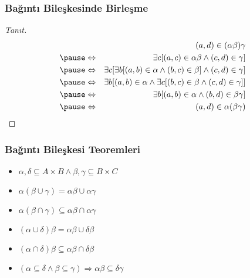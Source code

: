 \documentclass[dvipsnames]{beamer}
\theoremstyle{definition}
\theoremstyle{example}
\theoremstyle{plain}
\begin{document}
\begin{frame}
  \frametitle{Bağıntı Bileşkesinde Birleşme}

  \begin{proof}[Tanıt]
    \begin{eqnarray*}
      &                 & (a,d) \in (\alpha \beta)\gamma\\\pause
      & \Leftrightarrow & \exists c [(a,c) \in \alpha \beta
                              \wedge (c,d) \in \gamma]\\\pause
      & \Leftrightarrow & \exists c [\exists b [(a,b) \in \alpha
                                         \wedge (b,c) \in \beta]
                                         \wedge (c,d) \in \gamma]\\\pause
      & \Leftrightarrow & \exists b [(a,b) \in \alpha
                              \wedge \exists c [(b,c) \in \beta
                              \wedge (c,d) \in \gamma]]\\\pause
      & \Leftrightarrow & \exists b [(a,b) \in \alpha
                              \wedge (b,d) \in \beta \gamma]\\\pause
      & \Leftrightarrow & (a,d) \in \alpha (\beta \gamma)
    \end{eqnarray*}
  \end{proof}
\end{frame}

\begin{frame}
  \frametitle{Bağıntı Bileşkesi Teoremleri}

  \begin{itemize}
    \item $\alpha , \delta \subseteq A \times B \wedge
           \beta , \gamma \subseteq B \times C$

    \medskip
    \item $\alpha (\beta \cup \gamma) = \alpha \beta \cup \alpha \gamma$

    \item $\alpha (\beta \cap \gamma)
      \subseteq \alpha \beta \cap \alpha \gamma$

    \item $(\alpha \cup \delta) \beta = \alpha \beta \cup \delta \beta$

    \item $(\alpha \cap \delta) \beta
      \subseteq \alpha \beta \cap \delta \beta$

    \item $(\alpha \subseteq \delta \wedge \beta \subseteq \gamma)
      \Rightarrow \alpha \beta \subseteq \delta \gamma$
  \end{itemize}
\end{frame}
\end{document}
